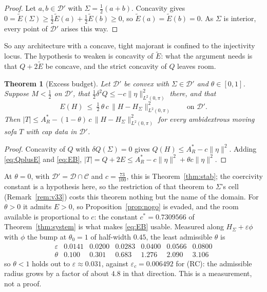 \documentclass[11pt]{article}
\newtheorem{theorem}{Theorem}
\theoremstyle{definition}
\newcommand{\Sig}{\Sigma}
\begin{document}
\begin{proof}
Let $a,b\in\mathcal D'$ with $\Sig=\tfrac12(a+b)$. Concavity gives
$0=\widetilde E(\Sig)\ge\tfrac12\widetilde E(a)+\tfrac12\widetilde E(b)\ge0$, so
$\widetilde E(a)=\widetilde E(b)=0$. As $\Sig$ is interior, every point of $\mathcal D'$
arises this way.
\end{proof}

So any architecture with a concave, tight majorant is confined to the injectivity locus.
The hypothesis to weaken is concavity of $\widetilde E$: what the argument needs is that
$Q+2\widetilde E$ be concave, and the strict concavity of $Q$ leaves room.

\begin{theorem}[Excess budget]\label{thm:budget}
Let $\mathcal D'$ be convex with $\Sig\in\mathcal D'$ and $\theta\in[0,1]$. Suppose
$M<\tfrac12$ on $\mathcal D'$, that $\tfrac12\delta^2Q\le-c\|\eta\|^2_{L^2(0,\pi)}$ there,
and that
\begin{equation}\label{eq:EB}
  E(H)\ \le\ \tfrac12\,\theta\,c\,\|H-H_\Sig\|^2_{L^2(0,\pi)}\qquad\text{on }\mathcal D' .
\end{equation}
Then $|T|\le A_R^\ast-(1-\theta)\,c\,\|H-H_\Sig\|^2_{L^2(0,\pi)}$ for every ambidextrous
moving sofa $T$ with cap data in $\mathcal D'$.
\end{theorem}

\begin{proof}
Concavity of $Q$ with $\delta Q(\Sig)=0$ gives $Q(H)\le A_R^\ast-c\|\eta\|^2$. Adding
\eqref{eq:QplusE} and \eqref{eq:EB},
$|T|=Q+2E\le A_R^\ast-c\|\eta\|^2+\theta c\|\eta\|^2$.
\end{proof}

At $\theta=0$, with $\mathcal D'=\mathcal D\cap\mathcal C$ and $c=\tfrac{73}{100}$, this is
Theorem~\ref{thm:stab}; the coercivity constant is a hypothesis here, so the restriction of
that theorem to $\Sig$'s cell (Remark~\ref{rem:v33}) costs this theorem nothing but the
name of the domain. For $\theta>0$ it admits $E>0$, so
Proposition~\ref{prop:nogo} is evaded, and the room available is proportional to $c$: the
constant $c^\ast=0.7309566$ of Theorem~\ref{thm:system} is what makes \eqref{eq:EB}
usable. Measured along $H_\Sig+\varepsilon\phi$ with $\phi$ the bump at $\theta_0=1$ of
half-width $0.45$, the least admissible $\theta$ is
\[
  \begin{array}{r|cccccc}
    \varepsilon & 0.0141 & 0.0200 & 0.0283 & 0.0400 & 0.0566 & 0.0800\\\hline
    \theta & 0.100 & 0.301 & 0.683 & 1.276 & 2.090 & 3.106
  \end{array}
\]
so $\theta<1$ holds out to $\varepsilon\approx0.031$, against $\varepsilon_c=0.006492$ for
(RC): the admissible radius grows by a factor of about $4.8$ in that direction. This is a
measurement, not a proof.
\end{document}
